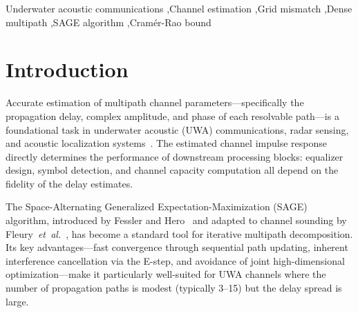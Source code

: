 \documentclass[a4paper,fleqn]{cas-dc}
\begin{document}

\begin{keywords}
 Underwater acoustic communications \sep Channel estimation \sep Grid mismatch \sep Dense multipath \sep SAGE algorithm \sep Cram\'er-Rao bound
\end{keywords}

\maketitle






\section{Introduction}
\label{sec:intro}

Accurate estimation of multipath channel parameters---specifically the propagation delay, complex amplitude, and phase of each resolvable path---is a foundational task in underwater acoustic (UWA) communications, radar sensing, and acoustic localization systems~\cite{stojanovic2009,eggen2001}. The estimated channel impulse response directly determines the performance of downstream processing blocks: equalizer design, symbol detection, and channel capacity computation all depend on the fidelity of the delay estimates.

The Space-Alternating Generalized Expectation-Maximization (SAGE) algorithm, introduced by Fessler and Hero~\cite{fessler1994} and adapted to channel sounding by Fleury~\textit{et~al.}~\cite{fleury1999}, has become a standard tool for iterative multipath decomposition. Its key advantages---fast convergence through sequential path updating, inherent interference cancellation via the E-step, and avoidance of joint high-dimensional optimization---make it particularly well-suited for UWA channels where the number of propagation paths is modest (typically 3--15) but the delay spread is large.
\end{document}
